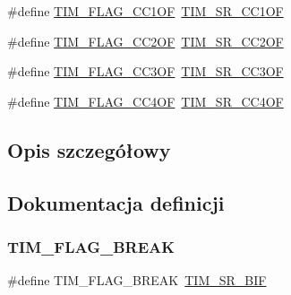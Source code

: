 \begin{DoxyCompactItemize}
\item 
\#define \hyperlink{group___t_i_m___flag__definition_ga38dfb7d1ed00af77d70bc3be28500108}{T\+I\+M\+\_\+\+F\+L\+A\+G\+\_\+\+C\+C1\+OF}~\hyperlink{group___peripheral___registers___bits___definition_ga819c4b27f8fa99b537c4407521f9780c}{T\+I\+M\+\_\+\+S\+R\+\_\+\+C\+C1\+OF}
\item 
\#define \hyperlink{group___t_i_m___flag__definition_ga4df0c71d3e695c214d49802942e04590}{T\+I\+M\+\_\+\+F\+L\+A\+G\+\_\+\+C\+C2\+OF}~\hyperlink{group___peripheral___registers___bits___definition_ga3b7798da5863d559ea9a642af6658050}{T\+I\+M\+\_\+\+S\+R\+\_\+\+C\+C2\+OF}
\item 
\#define \hyperlink{group___t_i_m___flag__definition_gac81f24eaffdf83c2db9d2e6078a00919}{T\+I\+M\+\_\+\+F\+L\+A\+G\+\_\+\+C\+C3\+OF}~\hyperlink{group___peripheral___registers___bits___definition_gaf7a2d4c831eb641ba082156e41d03358}{T\+I\+M\+\_\+\+S\+R\+\_\+\+C\+C3\+OF}
\item 
\#define \hyperlink{group___t_i_m___flag__definition_gafc8b04654766d98ba2c6fed601895a20}{T\+I\+M\+\_\+\+F\+L\+A\+G\+\_\+\+C\+C4\+OF}~\hyperlink{group___peripheral___registers___bits___definition_ga81ba979e8309b66808e06e4de34bc740}{T\+I\+M\+\_\+\+S\+R\+\_\+\+C\+C4\+OF}
\end{DoxyCompactItemize}


\subsection{Opis szczegółowy}


\subsection{Dokumentacja definicji}
\mbox{\label{group___t_i_m___flag__definition_ga01aedbe0676064a4d47dee474ddb863d}} 
\subsubsection{\texorpdfstring{T\+I\+M\+\_\+\+F\+L\+A\+G\+\_\+\+B\+R\+E\+AK}{TIM\_FLAG\_BREAK}}
{\footnotesize\ttfamily \#define T\+I\+M\+\_\+\+F\+L\+A\+G\+\_\+\+B\+R\+E\+AK~\hyperlink{group___peripheral___registers___bits___definition_ga6d52cd5a57c9a26b0d993c93d9875097}{T\+I\+M\+\_\+\+S\+R\+\_\+\+B\+IF}}

